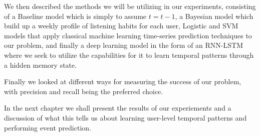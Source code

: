 We then described the methods we will be utilizing in our experiments, consisting of a Baseline model which is simply to assume $t =t-1$, a Bayesian model which build up a weekly profile of listening habits for each user, Logistic and SVM models that apply classical machine learning time-series prediction techniques to our problem, and finally a deep learning model in the form of an RNN-LSTM where we seek to utilize the capabilities for it to learn temporal patterns through a hidden memory state.

Finally we looked at different ways for measuring the success of our problem, with precision and recall being the preferred choice.

In the next chapter we shall present the results of our experiements and a discussion of what this tells us about learning user-level temporal patterns and performing event prediction.